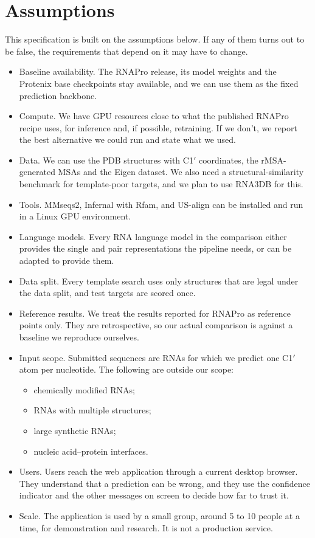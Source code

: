 \documentclass{FastFyp}
\begin{document}
\section{Assumptions}
This specification is built on the assumptions below. If any of them turns out to be false, the requirements that depend on it may have to change.
\begin{itemize}
\item Baseline availability. The RNAPro release, its model weights and the Protenix base checkpoints stay available, and we can use them as the fixed prediction backbone.
\item Compute. We have GPU resources close to what the published RNAPro recipe uses, for inference and, if possible, retraining. If we don't, we report the best alternative we could run and state what we used.
\item Data. We can use the PDB structures with C1$'$ coordinates, the rMSA-generated MSAs and the Eigen dataset. We also need a structural-similarity benchmark for template-poor targets, and we plan to use RNA3DB for this.
\item Tools. MMseqs2, Infernal with Rfam, and US-align can be installed and run in a Linux GPU environment.
\item Language models. Every RNA language model in the comparison either provides the single and pair representations the pipeline needs, or can be adapted to provide them.
\item Data split. Every template search uses only structures that are legal under the data split, and test targets are scored once.
\item Reference results. We treat the results reported for RNAPro as reference points only. They are retrospective, so our actual comparison is against a baseline we reproduce ourselves.
\item Input scope. Submitted sequences are RNAs for which we predict one C1$'$ atom per nucleotide. The following are outside our scope:
  \begin{itemize}
  \item chemically modified RNAs;
  \item RNAs with multiple structures;
  \item large synthetic RNAs;
  \item nucleic acid--protein interfaces.
  \end{itemize}
\item Users. Users reach the web application through a current desktop browser. They understand that a prediction can be wrong, and they use the confidence indicator and the other messages on screen to decide how far to trust it.
\item Scale. The application is used by a small group, around 5 to 10 people at a time, for demonstration and research. It is not a production service.
\end{itemize}
\end{document}
